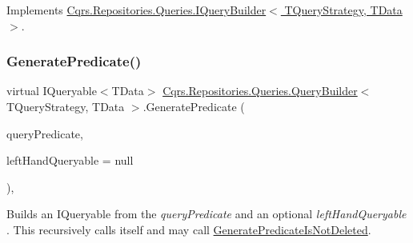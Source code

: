 Implements \hyperlink{interfaceCqrs_1_1Repositories_1_1Queries_1_1IQueryBuilder_ab903955b6fb1843a3e168b33252161a5_ab903955b6fb1843a3e168b33252161a5}{Cqrs.\+Repositories.\+Queries.\+I\+Query\+Builder$<$ T\+Query\+Strategy, T\+Data $>$}.

\mbox{\label{classCqrs_1_1Repositories_1_1Queries_1_1QueryBuilder_a553ad69e77d37f28b40e6c9d8e98b716_a553ad69e77d37f28b40e6c9d8e98b716}} 
\subsubsection{\texorpdfstring{Generate\+Predicate()}{GeneratePredicate()}\hspace{0.1cm}{\footnotesize\ttfamily [1/2]}}
{\footnotesize\ttfamily virtual I\+Queryable$<$T\+Data$>$ \hyperlink{classCqrs_1_1Repositories_1_1Queries_1_1QueryBuilder}{Cqrs.\+Repositories.\+Queries.\+Query\+Builder}$<$ T\+Query\+Strategy, T\+Data $>$.Generate\+Predicate (\begin{DoxyParamCaption}\item[{\hyperlink{interfaceCqrs_1_1Repositories_1_1Queries_1_1IQueryPredicate}{I\+Query\+Predicate}}]{query\+Predicate,  }\item[{I\+Queryable$<$ T\+Data $>$}]{left\+Hand\+Queryable = {\ttfamily null} }\end{DoxyParamCaption})\hspace{0.3cm}{\ttfamily [protected]}, {\ttfamily [virtual]}}



Builds an I\+Queryable from the {\itshape query\+Predicate}  and an optional {\itshape left\+Hand\+Queryable} . This recursively calls itself and may call \hyperlink{classCqrs_1_1Repositories_1_1Queries_1_1QueryBuilder_a9a6596d3dd0e4489bfa2d5d93ac93ec8_a9a6596d3dd0e4489bfa2d5d93ac93ec8}{Generate\+Predicate\+Is\+Not\+Deleted}. 

\mbox{\label{classCqrs_1_1Repositories_1_1Queries_1_1QueryBuilder_aa38989a8b4808c7c73e7cf038b535ea7_aa38989a8b4808c7c73e7cf038b535ea7}} 

